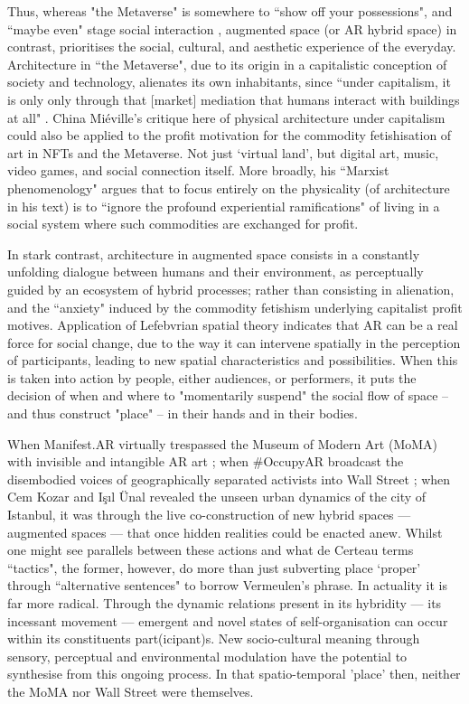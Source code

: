 Thus, whereas "the Metaverse" is somewhere to ``show off your possessions", and ``maybe even" stage social interaction \citep{marr2022}, augmented space (or AR hybrid space) in contrast, prioritises the social, cultural, and aesthetic experience of the everyday. Architecture in ``the Metaverse", due to its origin in a capitalistic conception of society and technology, alienates its own inhabitants, since ``under capitalism, it is only only through that [market] mediation that humans interact with buildings at all" \citep[p. 18]{mieville1998}. China Miéville's critique here of physical architecture under capitalism could also be applied to the profit motivation for the commodity fetishisation of art in NFTs and the Metaverse. Not just `virtual land', but digital art, music, video games, and social connection itself. More broadly, his ``Marxist phenomenology" argues that to focus entirely on the physicality (of architecture in his text) is to ``ignore the profound experiential ramifications" of living in a social system where such commodities are exchanged for profit. 

In stark contrast, architecture in augmented space consists in a constantly unfolding dialogue between humans and their environment, as perceptually guided by an ecosystem of hybrid processes; rather than consisting in alienation, and the ``anxiety" induced by the commodity fetishism underlying capitalist profit motives. Application of Lefebvrian spatial theory indicates that AR can be a real force for social change, due to the way it can intervene spatially in the perception of participants, leading to new spatial characteristics and possibilities. When this is taken into action by people, either audiences, or performers, it puts the decision of when and where to "momentarily suspend" the social flow of space -- and thus construct "place" -- in their hands and in their bodies.

When Manifest.AR virtually trespassed the Museum of Modern Art (MoMA) with invisible and intangible AR art \citep{veenhof2010}; when \#OccupyAR broadcast the disembodied voices of geographically separated activists into Wall Street \citep{skwarek2018}; when Cem Kozar and Işıl Ünal \citeyearpar{thiel2011,thiel2018} revealed the unseen urban dynamics of the city of Istanbul, it was through the live co-construction of new hybrid spaces — augmented spaces — that once hidden realities could be enacted anew. Whilst one might see parallels between these actions and what de Certeau terms ``tactics", the former, however, do more than just subverting place `proper' through ``alternative sentences" to borrow Vermeulen's phrase. In actuality it is far more radical. Through the dynamic relations present in its hybridity — its incessant movement — emergent and novel states of self-organisation can occur within its constituents part(icipant)s. New socio-cultural meaning through sensory, perceptual and environmental modulation have the potential to synthesise from this ongoing process. In that spatio-temporal 'place' then, neither the MoMA nor Wall Street were themselves.

